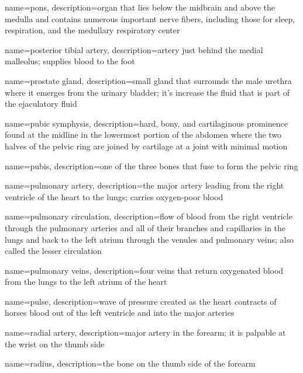 \documentclass[../../EMT-169.tex]{subfiles}
\begin{document}
	{
		name=pons,
		description={organ that lies below the midbrain and above the medulla and contains numerous important nerve fibers, including those for sleep, respiration, and the medullary respiratory center}
	}
	
	{
		name=posterior tibial artery,
		description={artery just behind the medial malleolus; supplies blood to the foot}
	}
	
	{
		name=prostate gland,
		description={small gland that surrounds the male urethra where it emerges from the urinary bladder; it's increase the fluid that is part of the ejaculatory fluid}
	}
	
	{
		name=pubic symphysis,
		description={hard, bony, and cartilaginous prominence found at the midline in the lowermost portion of the abdomen where the two halves of the pelvic ring are joined by cartilage at a joint with minimal motion}
	}
	
	{
		name=pubis,
		description={one of the three bones that fuse to form the pelvic ring}
	}
	
	{
		name=pulmonary artery,
		description={the major artery leading from the right ventricle of the heart to the lungs; carries oxygen-poor blood}
	}
	
	{
		name=pulmonary circulation,
		description={flow of blood from the right ventricle through the pulmonary arteries and all of their branches and capillaries in the lungs and back to the left atrium through the venules and pulmonary veins; also called the lesser circulation}
	}
	
	{
		name=pulmonary veins,
		description={four veins that return oxygenated blood from the lungs to the left atrium of the heart}
	}
	
	{
		name=pulse,
		description={wave of pressure created as the heart contracts of horses blood out of the left ventricle and into the major arteries}
	}
	
	{
		name=radial artery,
		description={major artery in the forearm; it is palpable at the wrist on the thumb side}
	}
	
	{
		name=radius,
		description={the bone on the thumb side of the forearm}
	}
	
\end{document}
